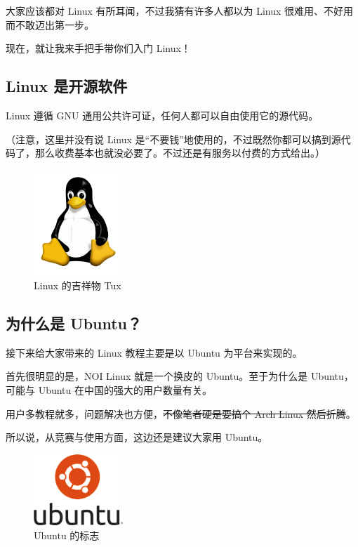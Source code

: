 \documentclass[UTF-8]{ctexart}
\begin{document}
		大家应该都对 Linux 有所耳闻，不过我猜有许多人都以为 Linux 很难用、不好用而不敢迈出第一步。
		
		现在，就让我来手把手带你们入门 Linux！
	
		\subsection{Linux 是开源软件}
		
			Linux 遵循 GNU 通用公共许可证，任何人都可以自由使用它的源代码。
			
			（注意，这里并没有说 Linux 是“不要钱”地使用的，不过既然你都可以搞到源代码了，那么收费基本也就没必要了。不过还是有服务以付费的方式给出。）
			
			\begin{figure}[H]
				\centering
				\includegraphics[width=0.3\textwidth]{fig/tux.png}
				\caption*{Linux 的吉祥物 Tux}
			\end{figure}
			
		\subsection{为什么是 Ubuntu？}
		
			接下来给大家带来的 Linux 教程主要是以 Ubuntu 为平台来实现的。
		
			首先很明显的是，NOI Linux 就是一个换皮的 Ubuntu。至于为什么是 Ubuntu，可能与 Ubuntu 在中国的强大的用户数量有关。
			
			用户多教程就多，问题解决也方便，\sout{不像笔者硬是要搞个 Arch Linux 然后折腾}。
			
			所以说，从竞赛与使用方面，这边还是建议大家用 Ubuntu。
		
			\begin{figure}[H]
				\centering
				\includegraphics[width=0.3\textwidth]{fig/ubuntu.png}
				\caption*{Ubuntu 的标志}
			\end{figure}
		
\end{document}
